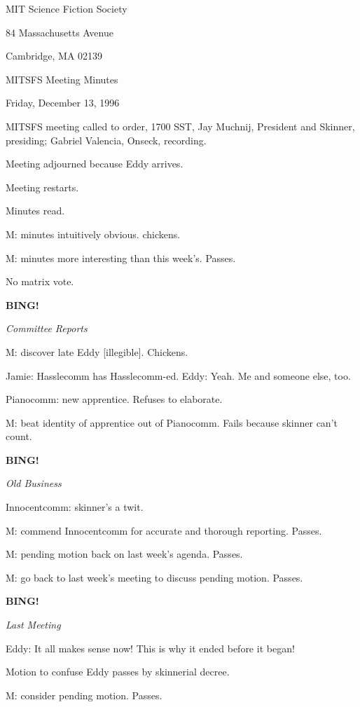 \documentclass[12pt]{article}
\newcommand{\bing}{{\bf BING!} }
\newcommand{\goto}[1]{\bing \vskip 12pt \centerline{{\em{#1}}}}
\begin{document}
\begin{center}

MIT Science Fiction Society 

84 Massachusetts Avenue

Cambridge, MA 02139

\vspace{12pt}

MITSFS Meeting Minutes 

Friday, December 13, 1996

\end{center}
 
\vspace{18pt}

\setlength{\parskip}{6pt}

\noindent
MITSFS meeting called to order, 1700 SST,
Jay Muchnij, President and Skinner, presiding; Gabriel Valencia, Onseck, recording.

Meeting adjourned because Eddy arrives.

Meeting restarts.

Minutes read.

M: minutes intuitively obvious. chickens.

M: minutes more interesting than this week's. Passes.

No matrix vote.

\goto{Committee Reports}

M: discover late Eddy [illegible]. Chickens.

Jamie: Hasslecomm has Hasslecomm-ed. Eddy: Yeah. Me and someone else, too.

Pianocomm: new apprentice. Refuses to elaborate.

M: beat identity of apprentice out of Pianocomm. Fails because skinner can't count.

\goto{Old Business}

Innocentcomm: skinner's a twit.

M: commend Innocentcomm for accurate and thorough reporting. Passes.

M: pending motion back on last week's agenda. Passes.

M: go back to last week's meeting to discuss pending motion. Passes.

\goto{Last Meeting}

Eddy: It all makes sense now! This is why it ended before it began!

Motion to confuse Eddy passes by skinnerial decree.

M: consider pending motion. Passes.
\end{document}
